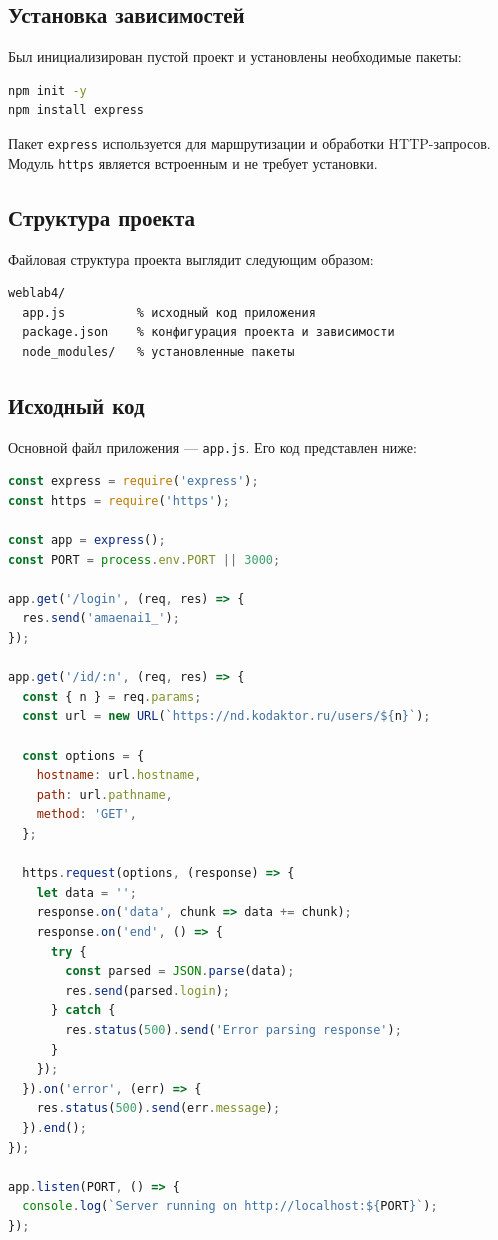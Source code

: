 \documentclass[a4paper,12pt]{article}
\begin{document}
\subsection{Установка зависимостей}

Был инициализирован пустой проект и установлены необходимые пакеты:

\begin{lstlisting}[language=bash, caption={Инициализация проекта}]
npm init -y
npm install express
\end{lstlisting}

Пакет \texttt{express} используется для маршрутизации и обработки
HTTP-запросов. Модуль \texttt{https} является встроенным и не требует
установки.

\subsection{Структура проекта}

Файловая структура проекта выглядит следующим образом:

\begin{lstlisting}[language=bash, caption={Структура проекта}]
weblab4/
  app.js          % исходный код приложения
  package.json    % конфигурация проекта и зависимости
  node_modules/   % установленные пакеты
\end{lstlisting}

\subsection{Исходный код}

Основной файл приложения --- \texttt{app.js}. Его код представлен
ниже:

\begin{lstlisting}[language=JavaScript, caption={app.js --- основной сервер}, label={lst:app}]
const express = require('express');
const https = require('https');

const app = express();
const PORT = process.env.PORT || 3000;

app.get('/login', (req, res) => {
  res.send('amaenai1_');
});

app.get('/id/:n', (req, res) => {
  const { n } = req.params;
  const url = new URL(`https://nd.kodaktor.ru/users/${n}`);

  const options = {
    hostname: url.hostname,
    path: url.pathname,
    method: 'GET',
  };

  https.request(options, (response) => {
    let data = '';
    response.on('data', chunk => data += chunk);
    response.on('end', () => {
      try {
        const parsed = JSON.parse(data);
        res.send(parsed.login);
      } catch {
        res.status(500).send('Error parsing response');
      }
    });
  }).on('error', (err) => {
    res.status(500).send(err.message);
  }).end();
});

app.listen(PORT, () => {
  console.log(`Server running on http://localhost:${PORT}`);
});
\end{lstlisting}
\end{document}
